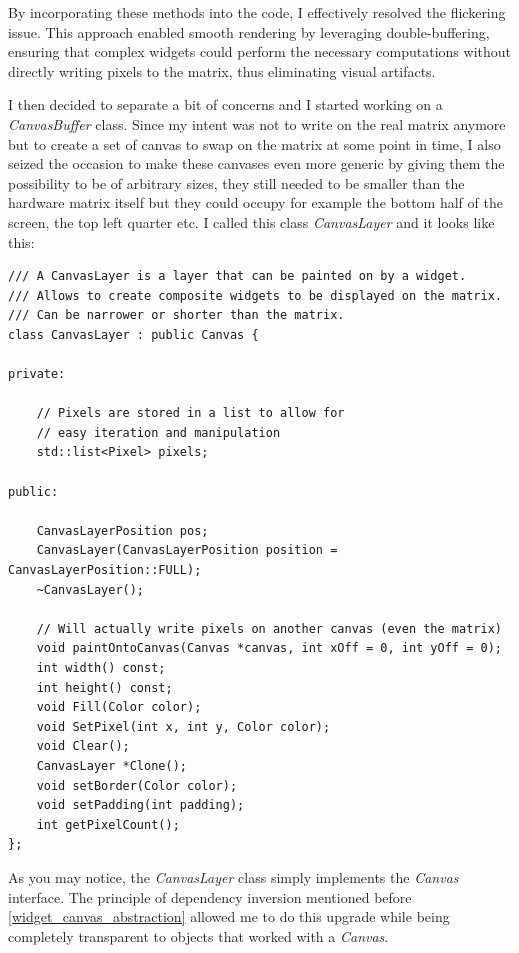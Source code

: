 By incorporating these methods into the code, I effectively resolved the flickering issue. This approach enabled smooth rendering by leveraging double-buffering, ensuring that complex widgets could perform the necessary computations without directly writing pixels to the matrix, thus eliminating visual artifacts.

\newpage

I then decided to separate a bit of concerns and I started working on a \textit{CanvasBuffer} class. Since my intent was not to write on the real matrix anymore but to create a set of canvas to swap on the matrix at some point in time, I also seized the occasion to make these canvases even more generic by giving them the possibility to be of arbitrary sizes, they still needed to be smaller than the hardware matrix itself but they could occupy for example the bottom half of the screen, the top left quarter etc. I called this class \textit{CanvasLayer} and it looks like this:

\begin{verbatim}
/// A CanvasLayer is a layer that can be painted on by a widget.
/// Allows to create composite widgets to be displayed on the matrix.
/// Can be narrower or shorter than the matrix.
class CanvasLayer : public Canvas {

private:

    // Pixels are stored in a list to allow for 
    // easy iteration and manipulation
    std::list<Pixel> pixels;

public:

    CanvasLayerPosition pos;
    CanvasLayer(CanvasLayerPosition position = CanvasLayerPosition::FULL);
    ~CanvasLayer();

    // Will actually write pixels on another canvas (even the matrix)
    void paintOntoCanvas(Canvas *canvas, int xOff = 0, int yOff = 0);
    int width() const;
    int height() const;
    void Fill(Color color);
    void SetPixel(int x, int y, Color color);
    void Clear();
    CanvasLayer *Clone();
    void setBorder(Color color);
    void setPadding(int padding);
    int getPixelCount();
};
\end{verbatim}

\newpage

As you may notice, the \textit{CanvasLayer} class simply implements the \textit{Canvas} interface. The principle of dependency inversion mentioned before \ref{widget_canvas_abstraction} allowed me to do this upgrade while being completely transparent to objects that worked with a \textit{Canvas}.

